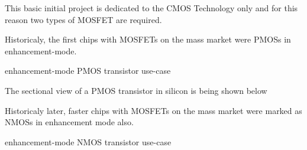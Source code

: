 
This basic initial project is dedicated to the \gls{CMOS} Technology only and for this reason two types of \gls{MOSFET} are required.

Historicaly, the first chips with \glspl{MOSFET} on the mass market were \glspl{PMOS} in enhancement-mode.

\begin{center}
    enhancement-mode \gls{PMOS} transistor use-case
    \begin{figure}[h] %
        \centering
        \begin{circuitdiagram}{20}{20}
        \end{circuitdiagram}
    \end{figure}
\end{center}

The sectional view of a \gls{PMOS} transistor in silicon is being shown below

Historicaly later, faster chips with \glspl{MOSFET} on the mass market were marked as \glspl{NMOS} in enhancement mode also.

\begin{center}
    enhancement-mode \gls{NMOS} transistor use-case
    \begin{figure}[h] %
        \centering
        \begin{circuitdiagram}{20}{20}
        \end{circuitdiagram}
    \end{figure}
\end{center}

